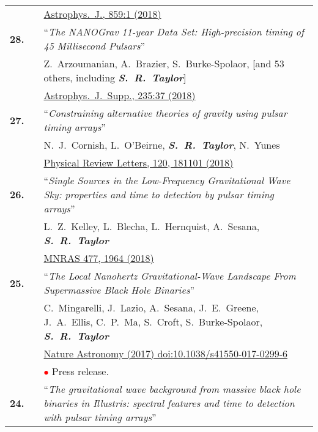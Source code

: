 \documentclass[11pt,letterpaper,sans]{moderncv}
\begin{document}
{\begin{longtable}{rp{0.3cm}p{15.8cm}}
&& \href{http://iopscience.iop.org/article/10.3847/1538-4357/aabd3b/meta}{{\color{color1} Astrophys.~J., 859:1 (2018)}}  \vspace{0.09cm}\\
\textbf{28.} & & ``\textit{The NANOGrav 11-year Data Set: High-precision timing of 45 Millisecond Pulsars}'' \\ 
&&Z.~Arzoumanian, A.~Brazier, S.~Burke-Spolaor, [and 53 others, including \textit{\textbf{S.~R.~Taylor}}]\\
&& \href{http://iopscience.iop.org/article/10.3847/1538-4365/aab5b0/meta}{{\color{color1} Astrophys.~J.~Supp., 235:37 (2018)}}  \vspace{0.09cm}\\
\textbf{27.} & & ``\textit{Constraining alternative theories of gravity using pulsar timing arrays}'' \\ 
&&N.~J.~Cornish, L.~O'Beirne, \textit{\textbf{S.~R.~Taylor}}, N.~Yunes\\
&& \href{https://journals.aps.org/prl/abstract/10.1103/PhysRevLett.120.181101}{{\color{color1} Physical Review Letters, 120, 181101 (2018)}}  \vspace{0.09cm}\\
\textbf{26.} & & ``\textit{Single Sources in the Low-Frequency Gravitational Wave Sky: properties and time to detection by pulsar timing arrays}'' \\ 
&&L.~Z.~Kelley, L.~Blecha, L.~Hernquist, A.~Sesana, \textit{\textbf{S.~R.~Taylor}} \\
&& \href{https://academic.oup.com/mnras/article-abstract/477/1/964/4937809?redirectedFrom=fulltext}{{\color{color1} MNRAS 477, 1964 (2018)}}  \vspace{0.09cm}\\
\textbf{25.} & & ``\textit{The Local Nanohertz Gravitational-Wave Landscape From Supermassive Black Hole Binaries}'' \\ 
&&C.~Mingarelli, J.~Lazio, A.~Sesana, J.~E.~Greene, J.~A.~Ellis, C.~P.~Ma, S.~Croft, S.~Burke-Spolaor, \textit{\textbf{S.~R.~Taylor}} \\
&& \href{https://www.nature.com/articles/s41550-017-0299-6}{{\color{color1} Nature Astronomy (2017)
doi:10.1038/s41550-017-0299-6}} \\
&& \textcolor{red}{$\bullet$} Press release. \vspace{0.09cm}\\
\textbf{24.} & & ``\textit{The gravitational wave background from massive black hole binaries in Illustris: spectral features and time to detection with pulsar timing arrays}'' \\ 

\end{longtable}}
\end{document}
